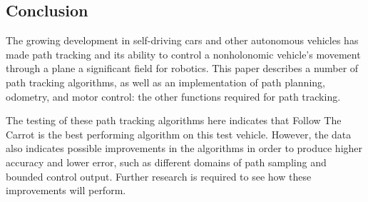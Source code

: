 \documentclass[mla7]{mla}
\begin{document}
\begin{paper}
\section{Conclusion}

The growing development in self-driving cars and other autonomous vehicles has made path tracking and its ability to control a nonholonomic vehicle's movement through a plane a significant field for robotics. This paper describes a number of path tracking algorithms, as well as an implementation of path planning, odometry, and motor control: the other functions required for path tracking.

The testing of these path tracking algorithms here indicates that Follow The Carrot is the best performing algorithm on this test vehicle. However, the data also indicates possible improvements in the algorithms in order to produce higher accuracy and lower error, such as different domains of path sampling and bounded control output. Further research is required to see how these improvements will perform.

\end{paper}
\end{document}
